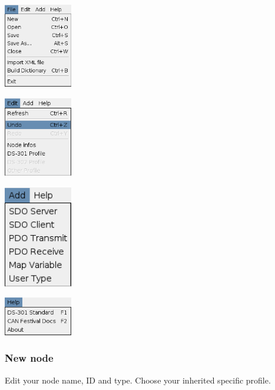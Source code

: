 \documentclass[12pt,twoside]{article}
\begin{document}
 \begin{center}
   \includegraphics[width=3cm]{Pictures/10000000000000B6000000DF1EDD1E73.png}
\end{center}
  \begin{center}
   \includegraphics[width=3cm]{Pictures/10000000000000AC000000C9C3F53FA6.png}
\end{center}
 \begin{center}
   \includegraphics[width=3cm]{Pictures/100000000000006D000000A31EC8CB54.png}
\end{center}
  \begin{center}
   \includegraphics[width=3cm]{Pictures/10000000000000AA0000006014F74635.png}
\end{center}

\subsubsection{New node}
Edit your node name, ID and type. Choose your inherited specific
profile.
\end{document}
